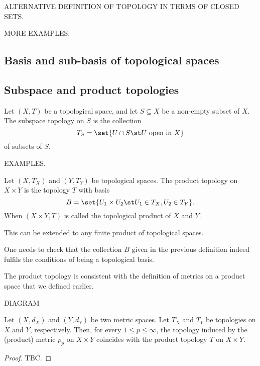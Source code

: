 ALTERNATIVE DEFINITION OF TOPOLOGY IN TERMS OF CLOSED SETS.

MORE EXAMPLES.

\subsection{Basis and sub-basis of topological spaces}

\subsection{Subspace and product topologies}
\begin{ndfn}
  Let $(X,T)$ be a topological space, and let $S \subseteq X$ be a non-empty subset of $X$. The subspace topology on $S$ is the collection
  \begin{equation*}
    T_S = \set{U \cap S \st U \text{ open in } X}
  \end{equation*}
  of subsets of $S$.
\end{ndfn}

EXAMPLES.

\begin{ndfn}
  Let $(X,T_X)$ and $(Y,T_Y)$ be topological spaces. The product topology on $X \times Y$ is the topology $T$ with basis
  \begin{equation*}
    B = \set{U_1 \times U_2 \st U_1 \in T_X, U_2 \in T_Y}.
  \end{equation*}
  When $(X \times Y, T)$ is called the topological product of $X$ and $Y$.
\end{ndfn}
This can be extended to any finite product of topological spaces.

\begin{remark}
  One needs to check that the collection $B$ given in the previous definition indeed fulfils the conditions of being a topological basis.
\end{remark}

The product topology is consistent with the definition of metrics on a product space that we defined earlier.

DIAGRAM

\begin{nthm}
  Let $(X,d_X)$ and $(Y,d_Y)$ be two metric spaces. Let $T_X$ and $T_Y$ be topologies on $X$ and $Y$, respectively. Then, for every $1 \leq p \leq \infty$, the topology induced by the (product) metric $\rho_p$ on $X \times Y$ coincides with the product topology $T$ on $X \times Y$.
\end{nthm}
\begin{proof}
  TBC.
\end{proof}

